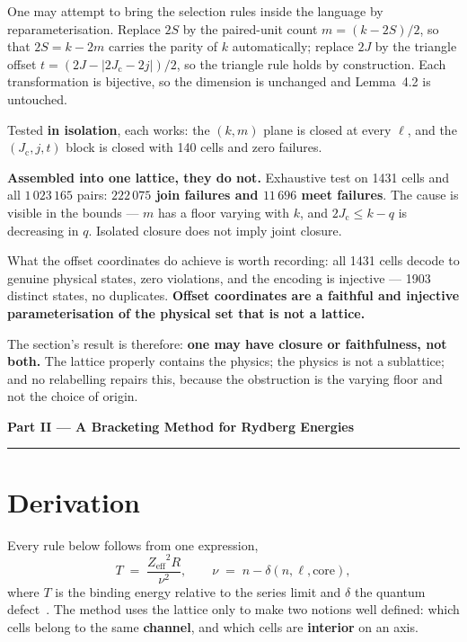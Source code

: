 \documentclass[11pt,a4paper]{article}
\newcommand{\parttitle}[1]{%
  \vspace{1.2\baselineskip}%
  {\noindent\LARGE\bfseries\color{acc} #1\par}%
  \vspace{0.4\baselineskip}\noindent\textcolor{acc}{\rule{\linewidth}{0.8pt}}%
  \vspace{0.6\baselineskip}\par}
\theoremstyle{definition}
\newcommand{\Zeff}{\ensuremath{Z_{\mathrm{eff}}}}
\newcommand{\Jc}{\ensuremath{J_{\mathrm{c}}}}
\begin{document}
One may attempt to bring the selection rules inside the language by
reparameterisation. Replace $2S$ by the paired-unit count $m=(k-2S)/2$, so that
$2S=k-2m$ carries the parity of $k$ automatically; replace $2J$ by the triangle
offset $t=(2J-|2\Jc-2j|)/2$, so the triangle rule holds by construction. Each
transformation is bijective, so the dimension is unchanged and Lemma~4.2 is
untouched.

Tested \textbf{in isolation}, each works: the $(k,m)$ plane is closed at every
$\ell$, and the $(\Jc,j,t)$ block is closed with 140 cells and zero failures.

\textbf{Assembled into one lattice, they do not.} Exhaustive test on 1431 cells
and all $1\,023\,165$ pairs: \textbf{$222\,075$ join failures and $11\,696$ meet
failures}. The cause is visible in the bounds --- $m$ has a floor varying with
$k$, and $2\Jc\le k-q$ is decreasing in $q$. Isolated closure does not imply
joint closure.

What the offset coordinates do achieve is worth recording: all 1431 cells decode
to genuine physical states, zero violations, and the encoding is injective ---
1903 distinct states, no duplicates. \textbf{Offset coordinates are a faithful
and injective parameterisation of the physical set that is not a lattice.}

The section's result is therefore: \textbf{one may have closure or faithfulness,
not both.} The lattice properly contains the physics; the physics is not a
sublattice; and no relabelling repairs this, because the obstruction is the
varying floor and not the choice of origin.

\parttitle{Part II --- A Bracketing Method for Rydberg Energies}

\section{Derivation}
Every rule below follows from one expression,
\begin{equation}
T \;=\; \frac{\Zeff^{2}R}{\nu^{2}}, \qquad \nu \;=\; n-\delta(n,\ell,\text{core}),
\label{eq:rydberg}
\end{equation}
where $T$ is the binding energy relative to the series limit and $\delta$ the
quantum defect~\cite{rydberg,ritz,seaton}. The method uses the lattice only to
make two notions well defined: which cells belong to the same \textbf{channel},
and which cells are \textbf{interior} on an axis.
\end{document}
